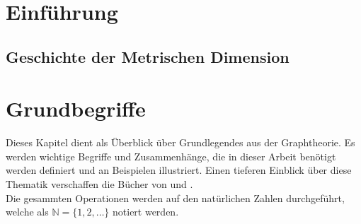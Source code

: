 


\listoftodos


\section{Einführung}
\subsection{Geschichte der Metrischen Dimension}
\pagebreak
\section{Grundbegriffe}
Dieses Kapitel dient als Überblick über Grundlegendes aus der Graphtheorie. Es werden wichtige Begriffe und Zusammenhänge, die in dieser Arbeit benötigt werden definiert und an Beispielen illustriert. Einen tieferen Einblick über diese Thematik verschaffen die Bücher von \cite{} und \cite{}.\\
Die gesammten Operationen werden auf den natürlichen Zahlen durchgeführt, welche als $\mathbb{N}=\{1,2,\ldots\}$ notiert werden.

